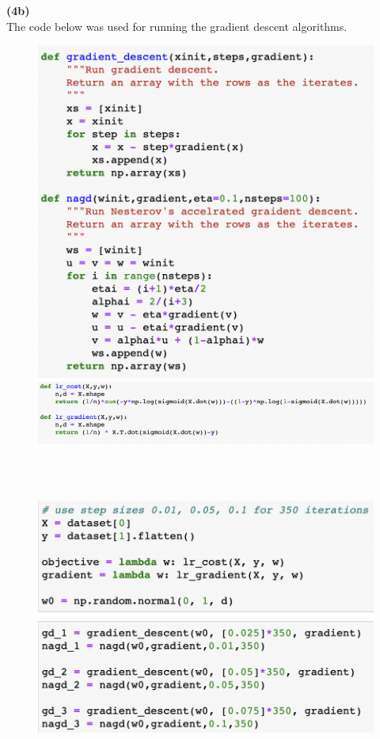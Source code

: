 \documentclass[12pt, letterpaper]{article}
\begin{document}
\newpage
\noindent \large{\textbf{(4b)} } \\
The code below was used for running the gradient descent algorithms.\\
\begin{figure}[h!]
  \includegraphics[scale=0.7]{./img/gd_nagd_code}
  \includegraphics[scale=0.8]{./img/lr_funcs}
\end{figure}\\
\\
\begin{figure}[h!]
  \includegraphics[scale=0.8]{./img/run_gd_code}
\end{figure}\\
\end{document}
